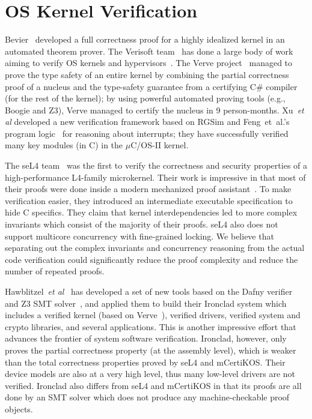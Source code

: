 \section{OS Kernel Verification}

Bevier~\cite{bevier89} developed a full correctness proof
for a highly idealized kernel in an automated theorem prover. The
Verisoft team~\cite{verisoft07} has done a large body of work aiming
to verify OS kernels and
hypervisors~\cite{leinenbach09,alkassar10}. The Verve
project~\cite{hawblitzel10} managed to prove the type safety of an
entire kernel by combining the partial correctness proof of a nucleus
and the type-safety guarantee from a certifying C\# compiler (for the
rest of the kernel); by using powerful automated proving tools (e.g.,
Boogie and Z3), Verve managed to certify the nucleus in 9
person-months.
Xu~{\em et al} \cite{xu16} developed a new verification framework based on RGSim
and Feng~{et~al.}'s program logic~\cite{feng08:aim} for reasoning
about interrupts; they have successfully verified many key modules
(in C) in the $\mu$C/OS-II kernel.

The seL4 team~\cite{klein2009sel4} was the first to verify the
correctness and security properties of a high-performance L4-family
microkernel. Their work is impressive in that most of their proofs
were done inside a modern mechanized proof
assistant~\cite{Paulson:Isabelle}.  To make verification easier, they
introduced an intermediate executable specification to hide C
specifics. They claim that kernel
interdependencies led to more complex invariants which consist
of the majority of their proofs. seL4 also does not support multicore
concurrency with fine-grained locking. 
We believe that separating out the complex invariants and concurrency
reasoning from the actual code verification could significantly reduce
the proof complexity and reduce the number of repeated proofs.

Hawblitzel~{\em et al}~\cite{ironclad14} has developed a set
of new tools based on the Dafny verifier~\cite{dafny10} and Z3 SMT
solver~\cite{moura08}, and applied them to build their Ironclad system
which includes a verified kernel (based on Verve~\cite{hawblitzel10}),
verified drivers, verified system and crypto libraries, and several
applications.  This is another impressive effort that advances the
frontier of system software verification. Ironclad, however, only
proves the partial correctness property (at the assembly level), which
is weaker than the total correctness properties proved by seL4 and
mCertiKOS. 
Their device models are also at a very high level, thus many low-level
drivers are not verified. Ironclad also differs
from seL4 and mCertiKOS in that its proofs are all done by an SMT solver
which does not produce any machine-checkable proof objects.

